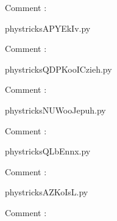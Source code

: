     Comment : 

    \clearpage
    


    \newcommand{\CaptionFigAPYEkIv}{<+Type your caption here+>}
    \begin{center}
        
    \end{center}
    phystricksAPYEkIv.py

    Comment : 

    \clearpage
    


    \newcommand{\CaptionFigQDPKooICzieh}{<+Type your caption here+>}
    \begin{center}
        
    \end{center}
    phystricksQDPKooICzieh.py

    Comment : 

    \clearpage
    


    \newcommand{\CaptionFigNUWooJepuh}{<+Type your caption here+>}
    \begin{center}
        
    \end{center}
    phystricksNUWooJepuh.py

    Comment : 

    \clearpage
    


    \newcommand{\CaptionFigQLbEnnx}{<+Type your caption here+>}
    \begin{center}
        
    \end{center}
    phystricksQLbEnnx.py

    Comment : 

    \clearpage
    


    \newcommand{\CaptionFigAZKoIsL}{<+Type your caption here+>}
    \begin{center}
        
    \end{center}
    phystricksAZKoIsL.py

    Comment : 

    \clearpage
    



